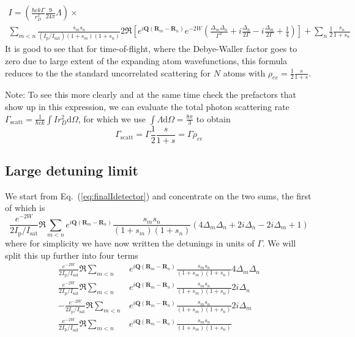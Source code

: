 \documentclass[11pt,letter]{article}
\newcommand{\bv}[1]{\ensuremath{\bm{#1}}}
\newcommand{\iisat}{\ensuremath{I_{\mathrm{p}}/I_{\mathrm{sat}}}}
\begin{document}
\begin{multline}
\label{eq:finalIdetector}
 I  =
 \left( 
 \frac{\hbar c k \Gamma}{r_{D}^{2}}  
     \frac{9}{24\pi} \Lambda 
  \right) \times \\
  \sum_{m<n} 
    \frac{ s_{m} s_{n} } 
         { (\iisat) ( 1+s_{m} )( 1+s_{n} ) }
    2 \Re\left[ 
               e^{ i \bv{Q}( \bv{R}_{m} - \bv{R}_{n} ) } e^{-2W}  
    \left(
        \frac{ \Delta_{m} \Delta_{n} }{ \Gamma^{2} } 
      + i \frac{ \Delta_{n} }{ 2 \Gamma } 
      - i \frac{ \Delta_{m} }{ 2 \Gamma } 
      + \frac{1}{4}  
    \right) \right]  
  + \sum_{n}  \frac{1}{2}
    \frac{ s_{n} } { 1 + s_{n} } 
\end{multline}
It is good to see that for time-of-flight, where the Debye-Waller factor goes
to zero due to large extent of the expanding atom wavefunctions,  this formula
reduces to the the standard uncorrelated scattering for $N$ atoms with
$\rho_{ee} = \frac{1}{2} \frac{s}{1+s}$.  

{\small
Note:  To see this more clearly and at the same time check the prefactors that show up in this expression, we can evaluate the total photon scattering rate  $\Gamma_{\mathrm{scatt}}= \frac{1}{\hbar c k}\int I r_{D}^{2} \mathrm{d}\Omega $,  for which we use $\int \Lambda \mathrm{d} \Omega = \frac{8\pi}{3}$ to obtain
\begin{equation}
\Gamma_{\mathrm{scatt}} =  \Gamma \frac{1}{2} \frac{s}{1+s} = \Gamma \rho_{ee}
\end{equation} 
 
}


\subsection{ Large detuning limit} 

We start from Eq.~(\ref{eq:finalIdetector}) and concentrate on the two sums,
the first of which is 
\begin{equation} 
  \frac{  e^{-2W}}{2\iisat} \Re 
  \sum_{m<n} 
               e^{ i \bv{Q}( \bv{R}_{m} - \bv{R}_{n} ) } 
    \frac{ s_{m} s_{n} } {( 1+s_{m} )( 1+s_{n} ) }
    \left(
         4\Delta_{m} \Delta_{n} 
      + 2i \Delta_{n} 
      - 2i \Delta_{m}
      + 1
    \right)  
\end{equation}
where for simplicity we have now written the detunings in units of $\Gamma$.
We will split this up further into four terms 
\begin{align} 
  \frac{  e^{-2W}}{2\iisat} \Re \sum_{m<n} & 
      e^{ i \bv{Q}( \bv{R}_{m} - \bv{R}_{n} ) } 
      \frac{ s_{m} s_{n} } {( 1+s_{m} )( 1+s_{n} ) } 4 \Delta_{m} \Delta_{n} \\
  \frac{  e^{-2W}}{2\iisat} \Re \sum_{m<n} & 
      e^{ i \bv{Q}( \bv{R}_{m} - \bv{R}_{n} ) } 
      \frac{ s_{m} s_{n} } {( 1+s_{m} )( 1+s_{n} ) } 2 i \Delta_{n}  \\
  -\frac{  e^{-2W}}{2\iisat} \Re \sum_{m<n} & 
      e^{ i \bv{Q}( \bv{R}_{m} - \bv{R}_{n} ) } 
      \frac{ s_{m} s_{n} } {( 1+s_{m} )( 1+s_{n} ) } 2 i \Delta_{m}  \\
  \frac{  e^{-2W}}{2\iisat} \Re \sum_{m<n} & 
      e^{ i \bv{Q}( \bv{R}_{m} - \bv{R}_{n} ) } 
      \frac{ s_{m} s_{n} } {( 1+s_{m} )( 1+s_{n} ) }   
\end{align}
\end{document}
